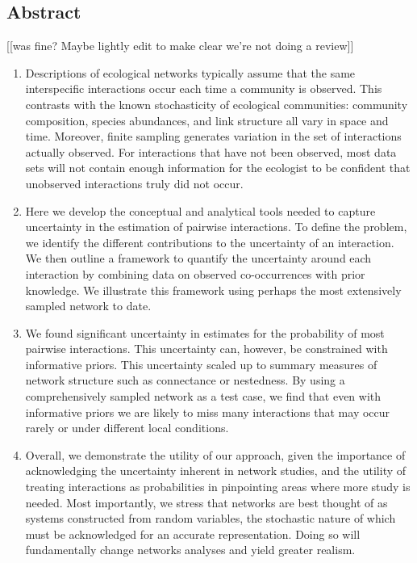 \documentclass[12pt]{article}
\begin{document}
\begin{spacing}{2.0}

\section*{Abstract}
  [[was fine? Maybe lightly edit to make clear we're not doing a review]]
  \begin{enumerate}

    \item  Descriptions of ecological networks typically assume that the same interspecific interactions occur each time a community is observed. This contrasts with the known stochasticity of ecological communities: community composition, species abundances, and link structure all vary in space and time. Moreover, finite sampling generates variation in the set of interactions actually observed. For interactions that have not been observed, most data sets will not contain enough information for the ecologist to be confident that unobserved interactions truly did not occur.
    \item Here we develop the conceptual and analytical tools needed to capture uncertainty in the estimation of pairwise interactions. To define the problem, we identify the different contributions to the uncertainty of an interaction. We then outline a framework to quantify the uncertainty around each interaction by combining data on observed co-occurrences with prior knowledge. We illustrate this framework using perhaps the most extensively sampled network to date. 
    \item We found significant uncertainty in estimates for the probability of most pairwise interactions. This uncertainty can, however, be constrained with informative priors. This uncertainty scaled up to summary measures of network structure such as connectance or nestedness. By using a comprehensively sampled network as a test case, we find that even with informative priors we are likely to miss many interactions that may occur rarely or under different local conditions. 
    \item Overall, we demonstrate the utility of our approach, given the importance of acknowledging the uncertainty inherent in network studies, and the utility of treating interactions as probabilities in pinpointing areas where more study is needed. Most importantly, we stress that networks are best thought of as systems constructed from random variables, the stochastic nature of which must be acknowledged for an accurate representation. Doing so will fundamentally change networks analyses and yield greater realism.
\end{enumerate}



\end{spacing}
\end{document}
